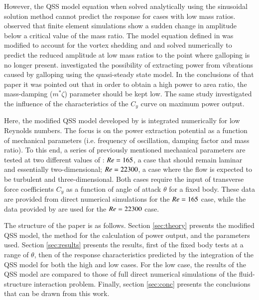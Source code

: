 However, the QSS model equation when solved analytically using the sinusoidal solution method cannot predict the response for cases with low mass ratios. \citet{Joly2012} observed that finite element simulations show a sudden change in amplitude below a critical value of the mass ratio. The model equation defined in \citet{Parkinson1964} was modified to account for the vortex shedding and and solved numerically to predict the reduced amplitude at low mass ratios to the point where galloping is no longer present. \citet{Barrero-Gil2010a} investigated the possibility of extracting power from vibrations caused by galloping using the quasi-steady state model. In the conclusions of that paper it was pointed out that in order to obtain a high power to area ratio, the mass-damping ($m^*\zeta$) parameter should be kept low. The same study investigated the influence of the characteristics of the $C_y$ curve on maximum power output.

Here, the modified QSS model developed by \citet{Joly2012} is integrated numerically for low Reynolds numbers. The focus is on the power extraction potential as a function of mechanical parameters (i.e. frequency of oscillation, damping factor and mass ratio). To this end, a series of previously mentioned mechanical parameters are tested at two different values of \reynoldsnumber: $Re = 165$, a case that should remain laminar and essentially two-dimensional; $Re = 22300$, a case where the flow is expected to be turbulent and three-dimensional. Both cases require the input of transverse force coefficients $C_y$ as a function of angle of attack $\theta$ for a fixed body. These data are provided from direct numerical simulations for the $Re = 165$ case, while the data provided by \citet{Parkinson1964} are used for the $Re = 22300$ case.

The structure of the paper is as follows. Section \ref{sec:theory} presents the modified QSS model, the method for the calculation of power output, and the parameters used. Section \ref{sec:results} presents the results, first of the fixed body tests at a range of $\theta$, then of the response characteristics predicted by the integration of the QSS model for both the high and low \reynoldsnumber cases. For the low \reynoldsnumber case, the results of the QSS model are compared to those of full direct numerical simulations of the fluid-structure interaction problem. Finally, section \ref{sec:conc} presents the conclusions that can be drawn from this work.
